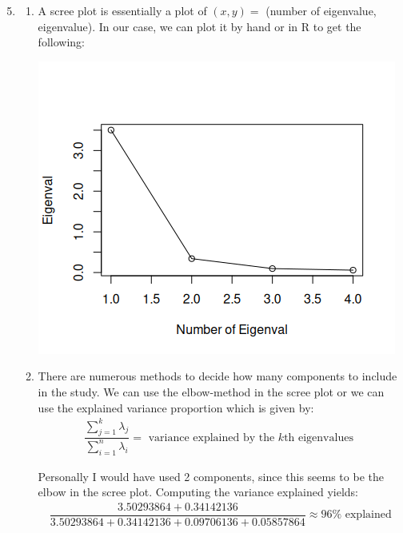 \begin{enumerate}[label=\arabic*.,leftmargin=*]
  \setcounter{enumi}{4}
  \item 
  \begin{enumerate}[label=\alph*),leftmargin=*]
    \item A scree plot is essentially a plot of $(x,y) = $ (number of eigenvalue, eigenvalue). In our case, we can plot it by hand or in R to get the following:
      \begin{center}
        \includegraphics[scale=0.7]{./figures/scree_plot.png}
      \end{center}
      \par\bigskip
    \item There are numerous methods to decide how many components to include in the study. We can use the elbow-method in the scree plot or we can use the explained variance proportion which is given by:
      \begin{equation*}
        \begin{gathered}
          \dfrac{\sum_{j=1}^{k}\lambda_j}{\sum_{i=1}^{n}\lambda_i} = \text{ variance explained by the $k$th eigenvalues }
        \end{gathered}
      \end{equation*}
      \par\bigskip
      \noindent Personally I would have used 2 components, since this seems to be the elbow in the scree plot. Computing the variance explained yields:
      \begin{equation*}
        \begin{gathered}
          \dfrac{3.50293864+0.34142136}{3.50293864+0.34142136+0.09706136+0.05857864} \approx 96\%\text{ explained}
        \end{gathered}
      \end{equation*}
  \end{enumerate}
\end{enumerate}
